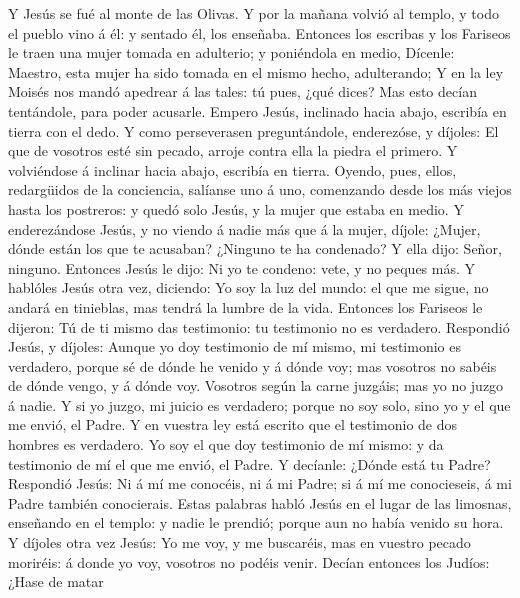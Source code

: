  Y Jesús se fué al monte de las Olivas.  Y
por la mañana volvió al templo, y todo el pueblo vino á él: y sentado
él, los enseñaba.  Entonces los escribas y los Fariseos le
traen una mujer tomada en adulterio; y poniéndola en medio,
 Dícenle: Maestro, esta mujer ha sido tomada en el mismo
hecho, adulterando;  Y en la ley Moisés nos mandó apedrear
á las tales: tú pues, ¿qué dices?  Mas esto decían
tentándole, para poder acusarle. Empero Jesús, inclinado hacia abajo,
escribía en tierra con el dedo.  Y como perseverasen
preguntándole, enderezóse, y díjoles: El que de vosotros esté sin
pecado, arroje contra ella la piedra el primero.  Y
volviéndose á inclinar hacia abajo, escribía en tierra. 
Oyendo, pues, ellos, redargüidos de la conciencia, salíanse uno á uno,
comenzando desde los más viejos hasta los postreros: y quedó solo Jesús,
y la mujer que estaba en medio.  Y enderezándose Jesús, y
no viendo á nadie más que á la mujer, díjole: ¿Mujer, dónde están los
que te acusaban? ¿Ninguno te ha condenado?  Y ella dijo:
Señor, ninguno. Entonces Jesús le dijo: Ni yo te condeno: vete, y no
peques más.  Y hablóles Jesús otra vez, diciendo: Yo soy
la luz del mundo: el que me sigue, no andará en tinieblas, mas tendrá la
lumbre de la vida.  Entonces los Fariseos le dijeron: Tú
de ti mismo das testimonio: tu testimonio no es verdadero.
 Respondió Jesús, y díjoles: Aunque yo doy testimonio de
mí mismo, mi testimonio es verdadero, porque sé de dónde he venido y á
dónde voy; mas vosotros no sabéis de dónde vengo, y á dónde voy.
 Vosotros según la carne juzgáis; mas yo no juzgo á
nadie.  Y si yo juzgo, mi juicio es verdadero; porque no
soy solo, sino yo y el que me envió, el Padre.  Y en
vuestra ley está escrito que el testimonio de dos hombres es verdadero.
 Yo soy el que doy testimonio de mí mismo: y da
testimonio de mí el que me envió, el Padre.  Y decíanle:
¿Dónde está tu Padre? Respondió Jesús: Ni á mí me conocéis, ni á mi
Padre; si á mí me conocieseis, á mi Padre también conocierais.
 Estas palabras habló Jesús en el lugar de las limosnas,
enseñando en el templo: y nadie le prendió; porque aun no había venido
su hora.  Y díjoles otra vez Jesús: Yo me voy, y me
buscaréis, mas en vuestro pecado moriréis: á donde yo voy, vosotros no
podéis venir.  Decían entonces los Judíos: ¿Hase de matar
